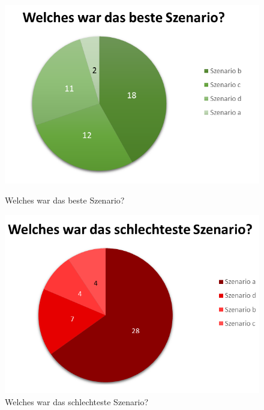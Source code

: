 \documentclass{Paper}
\begin{document}
\begin{figure}[H]
\begin{minipage}[t]{0.49\linewidth}
	\includegraphics[scale=0.7]{../Diagramme/bewertung/best.png}
	\caption{Welches war das beste Szenario?}
	\label{SzenarioGut}
\end{minipage}
\hfill
\begin{minipage}[t]{0.49\linewidth}
	\includegraphics[scale=0.7]{../Diagramme/bewertung/schlecht.png}
	\caption{Welches war das schlechteste Szenario?}
	\label{SzenarioSchlecht}
\end{minipage}
\end{figure}
\end{document}

